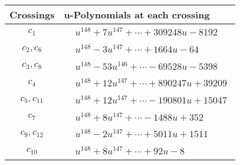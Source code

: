\documentclass[1p]{elsarticle_modified}
\theoremstyle{definition}
\begin{document}
\begin{tabular}{m{50pt}|m{274pt}}
Crossings & \hspace{64pt}u-Polynomials at each crossing \\
\hline $$\begin{aligned}c_{1}\end{aligned}$$&$\begin{aligned}
&u^{148}+7 u^{147}+\cdots+309248 u-8192
\end{aligned}$\\
\hline $$\begin{aligned}c_{2},c_{6}\end{aligned}$$&$\begin{aligned}
&u^{148}-3 u^{147}+\cdots+1664 u-64
\end{aligned}$\\
\hline $$\begin{aligned}c_{3},c_{8}\end{aligned}$$&$\begin{aligned}
&u^{148}-53 u^{146}+\cdots-69528 u-5398
\end{aligned}$\\
\hline $$\begin{aligned}c_{4}\end{aligned}$$&$\begin{aligned}
&u^{148}+12 u^{147}+\cdots+890247 u+39209
\end{aligned}$\\
\hline $$\begin{aligned}c_{5},c_{11}\end{aligned}$$&$\begin{aligned}
&u^{148}+12 u^{147}+\cdots-190801 u+15047
\end{aligned}$\\
\hline $$\begin{aligned}c_{7}\end{aligned}$$&$\begin{aligned}
&u^{148}+8 u^{147}+\cdots-1488 u+352
\end{aligned}$\\
\hline $$\begin{aligned}c_{9},c_{12}\end{aligned}$$&$\begin{aligned}
&u^{148}-2 u^{147}+\cdots+5011 u+1511
\end{aligned}$\\
\hline $$\begin{aligned}c_{10}\end{aligned}$$&$\begin{aligned}
&u^{148}+8 u^{147}+\cdots+92 u-8
\end{aligned}$\\
\hline
\end{tabular}\\~\\
\end{document}
